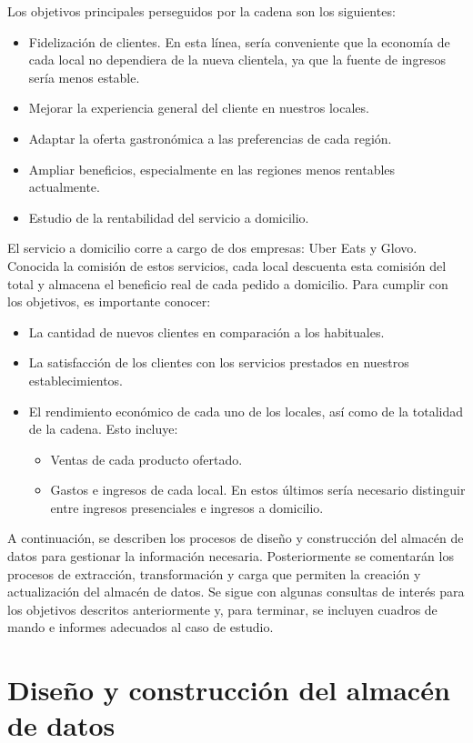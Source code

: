 \documentclass[11pt]{opticajnl}
\begin{document}
\noindent Los objetivos principales perseguidos por la cadena son los siguientes: 
\begin{itemize}
\item Fidelización de clientes. En esta línea, sería conveniente que la economía de cada local no dependiera de la nueva clientela, ya que la fuente de ingresos sería menos estable. 
\item Mejorar la experiencia general del cliente en nuestros locales. 
\item Adaptar la oferta gastronómica a las preferencias de cada región.
\item Ampliar beneficios, especialmente en las regiones menos rentables actualmente.
\item Estudio de la rentabilidad del servicio a domicilio.
\end{itemize}

El servicio a domicilio corre a cargo de dos empresas: Uber Eats y Glovo. Conocida la comisión de estos servicios, cada local descuenta esta comisión del total y almacena el beneficio real de cada pedido a domicilio. Para cumplir con los objetivos, es importante conocer: 
\begin{itemize}
\item La cantidad de nuevos clientes en comparación a los habituales. 
\item La satisfacción de los clientes con los servicios prestados en nuestros establecimientos.
\item El rendimiento económico de cada uno de los locales, así como de la totalidad de la cadena. Esto incluye:
\begin{itemize}
\item Ventas de cada producto ofertado.
\item Gastos e ingresos de cada local. En estos últimos sería necesario distinguir entre ingresos presenciales e ingresos a domicilio. 
\end{itemize}
\end{itemize}

A continuación, se describen los procesos de diseño y construcción del almacén de datos para gestionar la información necesaria. Posteriormente se comentarán los procesos de extracción, transformación y carga que permiten la creación y actualización del almacén de datos. Se sigue con algunas consultas de interés para los objetivos descritos anteriormente y, para terminar, se incluyen cuadros de mando e informes adecuados al caso de estudio.

\section{Diseño y construcción del almacén de datos}
\end{document}
